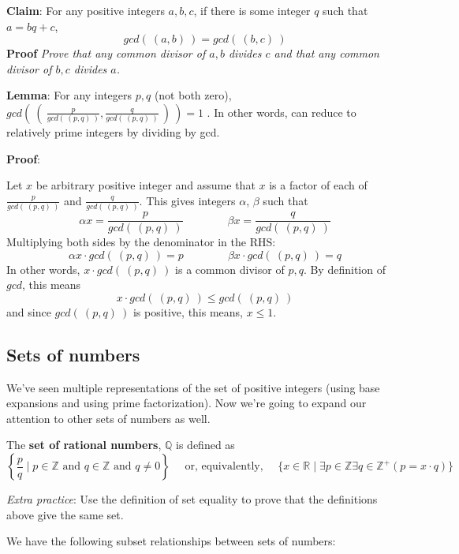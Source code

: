 \documentclass[12pt, oneside]{article}
\begin{document}
\vspace{150pt}


{\bf Claim}: For any positive integers $a,b,c$, if there is some integer $q$ such that $a = bq + c$,
\[
    gcd(~(a,b)~) = gcd (~(b,c)~)
\]
{\bf Proof} {\it Prove that any common divisor of $a,b$ divides $c$ and that any common 
divisor of $b,c$ divides $a$.}

\vspace{150pt}
 

{\bf Lemma}: For any integers $p, q$ (not both zero), 
$gcd \left(~ \left(~\frac{p}{gcd(~(p,q)~)}, \frac{q}{gcd(~(p,q)~)} ~\right) ~\right) = 1$ .
In other words, can reduce to relatively prime integers by dividing by gcd.

{\bf Proof}:

Let $x$ be arbitrary positive integer and assume that $x$ is a 
factor of each of $\frac{p}{gcd(~(p,q)~)}$ and $\frac{q}{gcd(~(p,q)~)}$. 
This gives integers $\alpha$, $\beta$ such that 
\[
    \alpha x = \frac{p}{gcd(~(p,q)~)} \qquad \qquad \beta x = \frac{q}{gcd(~(p,q)~)}
\]
Multiplying both sides by the denominator in the RHS: 
\[
    \alpha x \cdot gcd(~(p,q)~)= p \qquad \qquad \beta x \cdot gcd(~(p,q)~)= q
\]
In other words, $x \cdot gcd(~(p,q)~)$ is a common divisor of $p, q$. By definition of $gcd$, this means
\[
    x \cdot gcd (~(p,q)~) \leq gcd (~(p,q)~)
\]
and since $gcd(~(p,q)~)$ is positive, this means, $x \leq 1$.
\vspace{350pt}
 
\newpage
\subsection*{Sets of numbers}

We've seen multiple representations of the set of positive integers
(using base expansions and using prime factorization). Now we're 
going to expand our attention to other sets of numbers as well.


The {\bf set  of rational numbers}, $\mathbb{Q}$  is defined as 
\[
\left\{ \frac{p}{q} \mid p \in \mathbb{Z}  \text{ and  } q  \in \mathbb{Z} \text{ and } q \neq  0 \right\}
\text{~~~~or, equivalently,~~~~}
\{ x  \in  \mathbb{R} \mid \exists p \in \mathbb{Z}  \exists q \in \mathbb{Z}^+ ( p =  x \cdot q) \}
\]

{\it Extra practice}: Use the definition of set equality to prove that the definitions above  give the same set.

 

We have the following subset relationships between sets of numbers:
\end{document}
